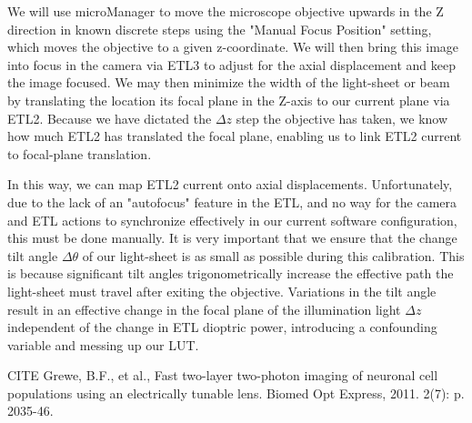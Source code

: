  We will use microManager to move the microscope objective upwards in the Z direction in known discrete steps using the "Manual Focus Position" setting, which moves the objective to a given z-coordinate.  We will then bring this image into focus in the camera via ETL3 to adjust for the axial displacement and keep the image focused. We may then minimize the width of the light-sheet or beam by translating the location its focal plane in the Z-axis to our current plane via ETL2. Because we have dictated the $\Delta z$ step the objective has taken, we know how much ETL2 has translated the focal plane, enabling us to link ETL2 current to focal-plane translation.

In this way, we can map ETL2 current onto axial displacements. Unfortunately, due to the lack of an "autofocus" feature in the ETL, and no way for the camera and ETL actions to synchronize effectively in our current software configuration, this must be done manually.
It is very important that we ensure that the change tilt angle $\Delta \theta$ of our light-sheet is as small as possible during this calibration. This is because significant tilt angles trigonometrically increase the effective path the light-sheet must travel after exiting the objective. Variations in the tilt angle result in an effective change in the focal plane of the illumination light $\Delta z$ independent of the change in ETL dioptric power, introducing a confounding variable and messing up our LUT.


CITE Grewe, B.F., et al., Fast two-layer two-photon imaging of neuronal cell populations using an electrically tunable lens. Biomed Opt Express, 2011. 2(7): p. 2035-46.